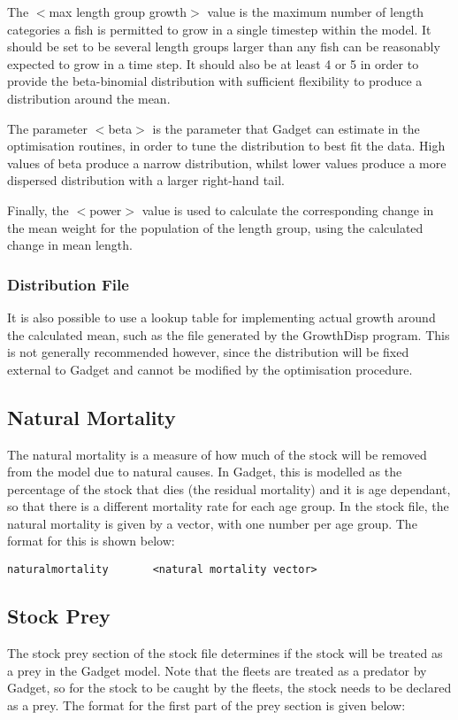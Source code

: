 \documentclass [a4paper, 10pt]{book}
\begin{document}
The $<$max length group growth$>$ value is the maximum number of length categories a fish is permitted to grow in a single timestep within the model. It should be set to be several length groups larger than any fish can be reasonably expected to grow in a time step. It should also be at least 4 or 5 in order to provide the beta-binomial distribution with sufficient flexibility to produce a distribution around the mean.

\bigskip
The parameter $<$beta$>$ is the parameter that Gadget can estimate in the optimisation routines, in order to tune the distribution to best fit the data.  High values of beta produce a narrow distribution, whilst lower values produce a more dispersed distribution with a larger right-hand tail.

\bigskip
Finally, the $<$power$>$ value is used to calculate the corresponding change in the mean weight for the population of the length group, using the calculated change in mean length.

\subsubsection{Distribution File}
It is also possible to use a lookup table for implementing actual growth around the calculated mean, such as the file generated by the GrowthDisp program. This is not generally recommended however, since the distribution will be fixed external to Gadget and cannot be modified by the optimisation procedure.


\subsection{Natural Mortality}\label{subsec:stocknatmort}
The natural mortality is a measure of how much of the stock will be removed from the model due to natural causes.  In Gadget, this is modelled as the percentage of the stock that dies (the residual mortality) and it is age dependant, so that there is a different mortality rate for each age group.  In the stock file, the natural mortality is given by a vector, with one number per age group.  The format for this is shown below:

\begin{verbatim}
naturalmortality       <natural mortality vector>
\end{verbatim}

\subsection{Stock Prey}\label{subsec:stockprey}
The stock prey section of the stock file determines if the stock will be treated as a prey in the Gadget model.  Note that the fleets are treated as a predator by Gadget, so for the stock to be caught by the fleets, the stock needs to be declared as a prey.  The format for the first part of the prey section is given below:
\end{document}
